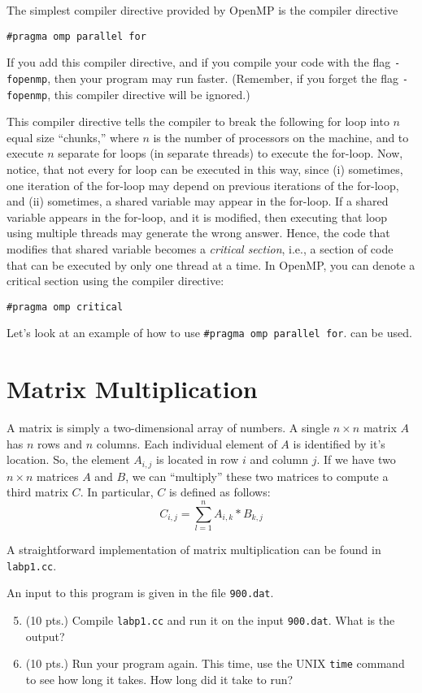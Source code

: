 \documentclass[12pt]{article}
\begin{document}
The simplest compiler directive provided by OpenMP is the compiler directive
\begin{verbatim}
#pragma omp parallel for
\end{verbatim}
If you add this compiler directive, and if you compile your code
with the flag \verb+-fopenmp+, then your program may run faster.
(Remember, if you forget the flag \verb+-fopenmp+, this compiler directive will be ignored.)

This compiler directive tells the compiler to break the following for loop
into $n$ equal size ``chunks,'' where $n$ is the number of processors on the
machine, and to execute $n$ separate for loops (in separate threads) to execute the for-loop.   Now, notice, that not every for loop can be executed in this
way, since (i) sometimes, one iteration of the for-loop may depend on previous iterations of the for-loop, and (ii) sometimes, a shared variable may appear
in the for-loop.  If a shared variable appears in the for-loop, and it is modified, then executing that loop using multiple threads may generate the
wrong answer.   Hence, the code that modifies that shared variable
becomes a \emph{critical section}, i.e., a section of code that can be 
executed by only one thread at a time.   In OpenMP, you can denote
a critical section using the compiler directive:
\begin{verbatim}
#pragma omp critical
\end{verbatim}
 

Let's look at an example of how to use \verb+#pragma omp parallel for+.
can be used.

\section*{Matrix Multiplication}
A matrix is simply a two-dimensional array of numbers.
A single $n \times n$ matrix $A$ has $n$ rows and $n$ columns.
Each individual element of $A$ is identified by it's location.
So, the element $A_{i,j}$ is located in row $i$ and column $j$.
If we have two $n \times n$ matrices $A$ and $B$, we can 
``multiply'' these two matrices to compute a third matrix $C$.
In particular, $C$ is defined as follows:
\begin{equation}
C_{i,j} = \sum_{l=1}^n A_{i,k} * B_{k,j}
\end{equation}

A straightforward implementation of matrix multiplication
can be found in \verb+labp1.cc+.

An input to this program is given in the file \verb+900.dat+.
\begin{enumerate}
\setcounter{enumi}{4}
\item (10 pts.) Compile \verb+labp1.cc+ and run it on the input
\verb+900.dat+.  What is the output?

\item (10 pts.) Run your program again.  This time, use the UNIX
\verb+time+ command to see how long it takes.  How long did it take to run?
\end{enumerate}
\end{document}
